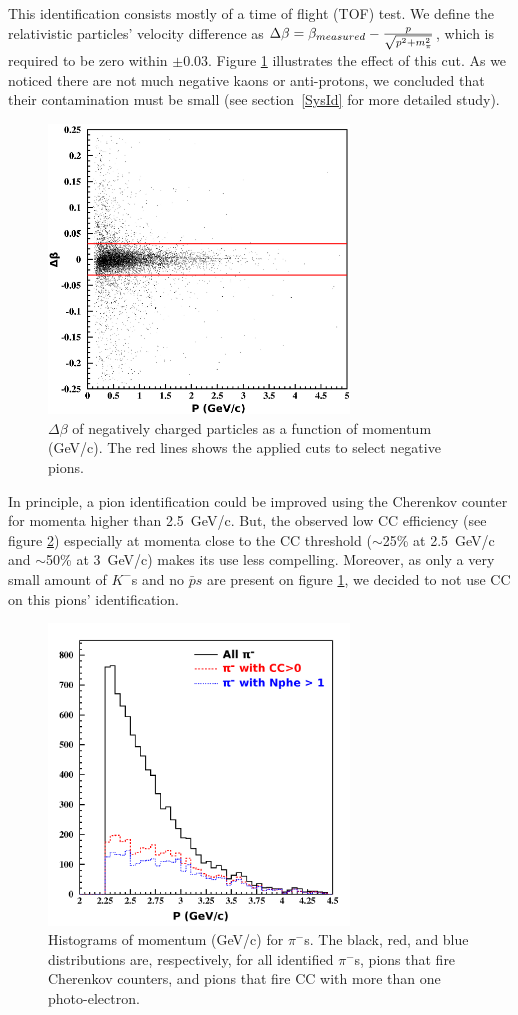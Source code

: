 This identification consists mostly of a time of flight (TOF) test. We define 
the relativistic particles' velocity difference as
$\Delta \beta = \beta_{measured} - {p \over \sqrt{p^2 + m_\pi^2}}$, which is required to be zero within $\pm 0.03$. Figure \ref{PionTOF} illustrates the effect of this cut. As we noticed there are not much negative kaons or anti-protons, we concluded that their contamination must be small (see section~\ref{SysId} for more detailed study).

\begin{figure}[tbp]
\centering
\includegraphics[width=8cm] {chap5-fig/fig05.png} 
\caption {$\Delta \beta$ of negatively charged particles as a function of momentum (GeV/c). The red lines shows the applied cuts to select negative pions.}
\label{PionTOF}
\end{figure}

In principle, a pion identification could be improved using the Cherenkov counter 
for momenta higher than 2.5~GeV/c. But, the observed low CC efficiency (see figure 
\ref{PionCC}) especially at momenta close to the CC threshold ($\sim$25\% at 
2.5~GeV/c and $\sim$50\% at 3~GeV/c) makes its use less compelling. 
Moreover, as only a very small amount of $K^-$s and no ${\bar p}s$ are present on figure \ref{PionTOF}, we decided to not use CC on this pions' identification.

\begin{figure}[tbp]
\centering
\includegraphics[width=8cm] {chap5-fig/fig06.png} 
\caption {Histograms of momentum (GeV/c) for $\pi^-$s. The black, red, and blue distributions are, respectively, for all identified $\pi^-$s, pions that fire Cherenkov counters, and pions that fire CC with more than one photo-electron.}
\label{PionCC}
\end{figure}

